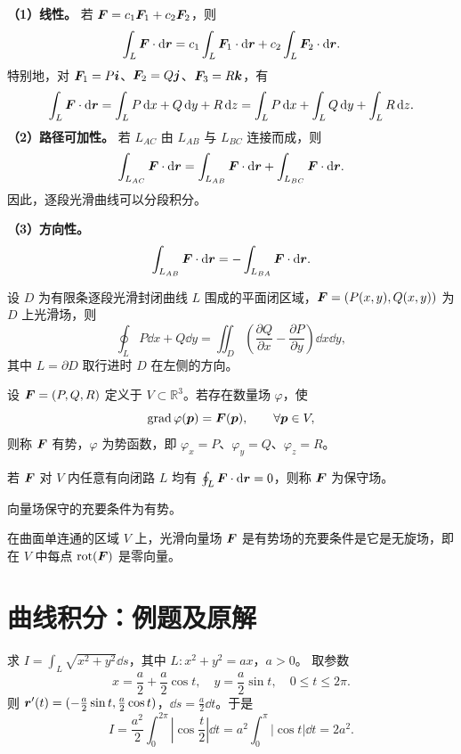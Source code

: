 \textbf{（1）线性。} 若 $\bm{F}=c_1\bm{F}_1+c_2\bm{F}_2$，则
\[
\int_L\bm{F}\cdot\mathop{}\!\mathrm d\bm{r}=c_1\int_L\bm{F}_1\cdot\mathop{}\!\mathrm d\bm{r}+c_2\int_L\bm{F}_2\cdot\mathop{}\!\mathrm d\bm{r}.
\]
特别地，对 $\bm{F}_1=P\bm{i}$、$\bm{F}_2=Q\bm{j}$、$\bm{F}_3=R\bm{k}$，有
\[
\int_L\bm{F}\cdot\mathop{}\!\mathrm d\bm{r}=\int_L P\mathop{}\!\mathrm d x+Q\mathop{}\!\mathrm d y+R\mathop{}\!\mathrm d z
=\int_L P\mathop{}\!\mathrm d x+\int_L Q\mathop{}\!\mathrm d y+\int_L R\mathop{}\!\mathrm d z.
\]
\textbf{（2）路径可加性。} 若 $L_{AC}$ 由 $L_{AB}$ 与 $L_{BC}$ 连接而成，则
\[
\int_{L_{AC}}\bm{F}\cdot\mathop{}\!\mathrm d\bm{r}=\int_{L_{AB}}\bm{F}\cdot\mathop{}\!\mathrm d\bm{r}+\int_{L_{BC}}\bm{F}\cdot\mathop{}\!\mathrm d\bm{r}.
\]
因此，逐段光滑曲线可以分段积分。

\textbf{（3）方向性。}
\[
\int_{L_{AB}}\bm{F}\cdot\mathop{}\!\mathrm d\bm{r}=-\int_{L_{BA}}\bm{F}\cdot\mathop{}\!\mathrm d\bm{r}.
\]

设 $D$ 为有限条逐段光滑封闭曲线 $L$ 围成的平面闭区域，$\bm{F}=(P(x,y),Q(x,y))$ 为 $D$ 上光滑场，则
\[
\oint_L P\dd x+Q\dd y=\iint_D\left(\frac{\partial Q}{\partial x}-\frac{\partial P}{\partial y}\right)\dd x\dd y,
\]
其中 $L=\partial D$ 取行进时 $D$ 在左侧的方向。

设 $\bm{F}=(P,Q,R)$ 定义于 $V\subset\mathbb R^3$。若存在数量场 $\varphi$，使
\[
\operatorname{grad}\varphi(\bm{p})=\bm{F}(\bm{p}),\qquad\forall\bm{p}\in V,
\]
则称 $\bm{F}$ 有势，$\varphi$ 为势函数，即 $\varphi_x=P$、$\varphi_y=Q$、$\varphi_z=R$。

若 $\bm{F}$ 对 $V$ 内任意有向闭路 $L$ 均有 $\oint_L\bm{F}\cdot\mathop{}\!\mathrm d\bm{r}=0$，则称 $\bm{F}$ 为保守场。

向量场保守的充要条件为有势。

在曲面单连通的区域 $V$ 上，光滑向量场 $\bm{F}$ 是有势场的充要条件是它是无旋场，即在 $V$ 中每点 $\operatorname{rot}(\bm{F})$ 是零向量。

\clearpage
\section{曲线积分：例题及原解}
求 $I=\int_L\sqrt{x^2+y^2}\dd s$，其中 $L:x^2+y^2=ax$，$a>0$。
\sol 取参数
\[
x=\frac a2+\frac a2\cos t,\quad y=\frac a2\sin t,\quad 0\le t\le2\pi.
\]
则 $\bm{r}'(t)=(-\frac a2\sin t,\frac a2\cos t)$，$\dd s=\frac a2\dd t$。于是
\[
I=\frac{a^2}{2}\int_0^{2\pi}\left|\cos\frac t2\right|\dd t
=a^2\int_0^\pi|\cos t|\dd t=2a^2.
\]

